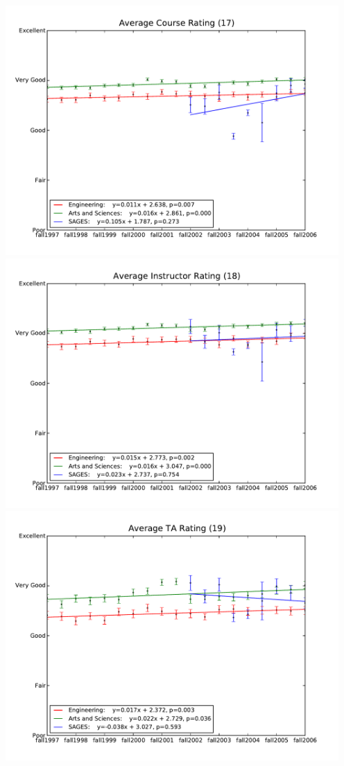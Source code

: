 \documentclass[12pt]{article}
\begin{document}
\begin{center}
    \includegraphics[width=5in]{figures/17_rating_over_time.pdf} \\
    \includegraphics[width=5in]{figures/18_instructor_over_time.pdf} \\
    \includegraphics[width=5in]{figures/19_ta_over_time.pdf} \\

\end{center}
\end{document}
